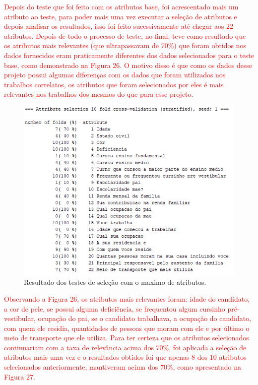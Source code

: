 \par
\textcolor{red}{Depois do teste que foi feito com os atributos base, foi acrescentado mais um atributo ao teste, para poder mais uma vez executar a seleção de atributos e depois analisar os resultados, isso foi feito sucessivamente até chegar aos 22 atributos. Depois de todo o processo de teste, no final, teve como resultado que os atributos mais relevantes (que ultrapassavam de 70\%) que foram obtidos nos dados fornecidos eram praticamente diferentes dos dados selecionados para o teste base, como demonstrado na Figura 26. O motivo disso é que  como os dados desse projeto possui algumas diferenças com os dados que foram utilizados nos trabalhos correlatos, os atributos que foram selecionados por eles é mais relevantes nos trabalhos dos mesmos do que para esse projeto.}

\par
\begin{figure}[!htp]
	\begin{center}
    \caption{\label{fig:waveform_fig} Resultado dos testes de seleção com o maximo de atributos.}
	\includegraphics[scale=0.90]{Figuras/22_atributos.png}
	\end{center}
\end{figure}

\par
\textcolor{red}{}

\par
\textcolor{red}{}

\par
\textcolor{red}{Observando a Figura 26,  os atributos mais relevantes foram: idade do candidato, a cor de pele, se possui alguma deficiência, se frequentou algum cursinho pré-vestibular, ocupação do pai, se o candidato trabalhava, a ocupação do candidato, com quem ele residia, quantidades de pessoas que moram com ele e por último o meio de transporte que ele utiliza. Para ter certeza que os atributos selecionados continuariam com a taxa de relevância acima dos 70\%, foi aplicada a seleção de atributos mais uma vez e o resultados obtidos foi que apenas 8 dos 10 atributos selecionados anteriormente, mantiveram acima dos 70\%, como apresentado na Figura 27.}

